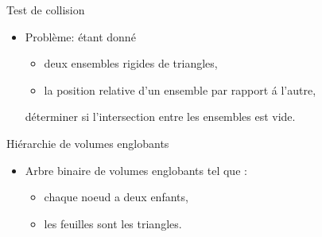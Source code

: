 
%
%
\begin{frame} {Test de collision}
  \begin{itemize}
    \item Probl\`eme: \'etant donn\'e
      \begin{itemize}
        \item deux ensembles rigides de triangles,
        \item la position relative d'un ensemble par rapport \'a l'autre,
      \end{itemize}
      d\'eterminer si l'intersection entre les ensembles est vide.
  \end{itemize}
\end{frame}

%
%
\begin{frame} {Hi\'erarchie de volumes englobants}
  \begin{itemize}
  \item Arbre binaire de volumes englobants tel que :
    \begin{itemize}
    \item chaque noeud a deux enfants,
    \item les feuilles sont les triangles.
    \end{itemize}
  \end{itemize}
\end{frame}

%
%

